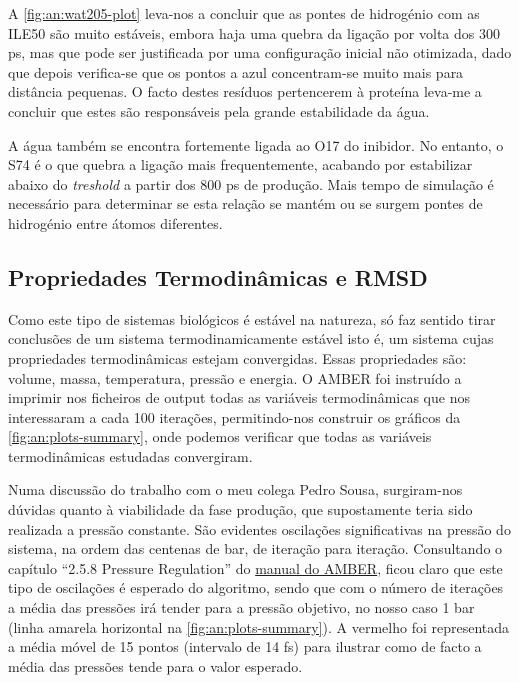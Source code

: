 \documentclass[12pt,a4paper]{article}
\begin{document}
	A \cref{fig:an:wat205-plot} leva-nos a concluir que as pontes de hidrogénio com as ILE50 são muito estáveis, embora haja uma quebra da ligação por volta dos 300 ps, mas que pode ser justificada por uma configuração inicial não otimizada, dado que depois verifica-se que os pontos a azul concentram-se muito mais para distância pequenas. O facto destes resíduos pertencerem à proteína leva-me a concluir que estes são responsáveis pela grande estabilidade da água. 
	
	A água também se encontra fortemente ligada ao O17 do inibidor. No entanto, o S74 é o que quebra a ligação mais frequentemente, acabando por estabilizar abaixo do \textit{treshold} a partir dos 800 ps de produção. Mais tempo de simulação é necessário para determinar se esta relação se mantém ou se surgem pontes de hidrogénio entre átomos diferentes.

\subsection{Propriedades Termodinâmicas e RMSD}
	Como este tipo de sistemas biológicos é estável na natureza, só faz sentido tirar conclusões de um sistema termodinamicamente estável isto é, um sistema cujas propriedades termodinâmicas estejam convergidas. Essas propriedades são: volume, massa, temperatura, pressão e energia. O AMBER foi instruído a imprimir nos ficheiros de output todas as variáveis termodinâmicas que nos interessaram a cada 100 iterações, permitindo-nos construir os gráficos da \cref{fig:an:plots-summary}, onde podemos verificar que todas as variáveis termodinâmicas estudadas convergiram.
	
	Numa discussão do trabalho com o meu colega Pedro Sousa, surgiram-nos dúvidas quanto à viabilidade da fase produção, que supostamente teria sido realizada a pressão constante. São evidentes oscilações significativas na pressão do sistema, na ordem das centenas de bar, de iteração para iteração. Consultando o capítulo ``2.5.8 Pressure Regulation'' do \href{https://ambermd.org/doc12/Amber12.pdf}{manual do AMBER}, ficou claro que este tipo de oscilações é esperado do algoritmo, sendo que com o número de iterações a média das pressões irá tender para a pressão objetivo, no nosso caso 1 bar (linha amarela horizontal na \cref{fig:an:plots-summary}). A vermelho foi representada a média móvel de 15 pontos (intervalo de 14 fs) para ilustrar como de facto a média das pressões tende para o valor esperado.
	
\end{document}
